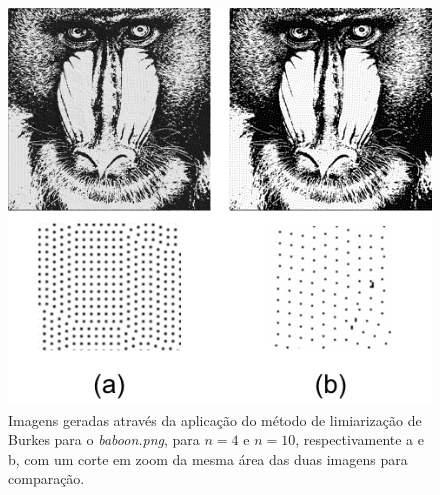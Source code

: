     \begin{figure}[ht]
        \centering
        \includegraphics[width=\linewidth]{bersen.png}
        \caption{Imagens geradas através da aplicação do método de limiarização de Burkes para o \textit{baboon.png}, para $n = 4$ e $n = 10$, respectivamente a e b, com um corte em zoom da mesma área das duas imagens para comparação.}
        \label{fig:bersen}
    \end{figure}
